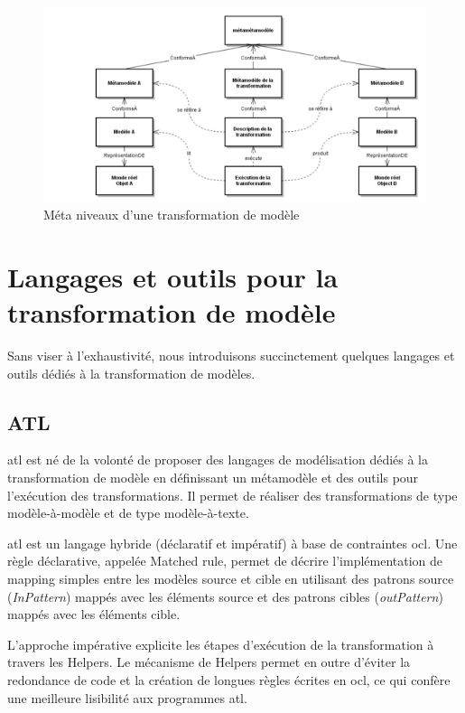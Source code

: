 \begin{figure}[!htbp]
 \begin{center}
  \includegraphics[width=1\textwidth]{figures/images/Chapitre1/transfoPrincipe.png}
 \end{center}
 \caption{Méta niveaux d'une transformation de modèle}
 \label{fig:TransfoPrincipe}
\end{figure}


\section{Langages et outils pour la transformation de modèle}
Sans viser à l'exhaustivité, nous introduisons succinctement quelques langages et outils 
dédiés à la transformation de modèles. 

\subsection{ATL}
\label{sec:ATL}
\gls{atl} \cite{jouault2006transforming} 
\cite{jouault2008atl} est né de la volonté de proposer des langages de 
modélisation dédiés à la transformation de modèle en définissant un métamodèle 
et des outils pour l'exécution des transformations. Il permet de réaliser des 
transformations de type modèle-à-modèle et de type modèle-à-texte.

\gls{atl} est un langage hybride (déclaratif et impératif) à base de contraintes \gls{ocl}. Une règle déclarative, appelée Matched rule, permet de décrire 
l'implémentation de mapping simples entre les modèles source et cible en 
utilisant des patrons source (\textit{InPattern}) mappés avec les éléments 
source et des patrons cibles (\textit{outPattern}) mappés avec les éléments 
cible. 

L'approche impérative explicite les étapes d'exécution de la transformation à 
travers les Helpers. Le mécanisme de Helpers permet en outre d'éviter la 
redondance de code et la création de longues règles écrites en \gls{ocl}, ce qui 
confère une meilleure lisibilité aux programmes \gls{atl}. 

